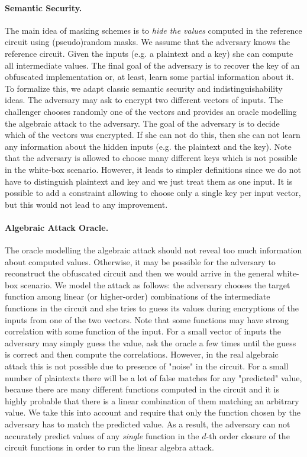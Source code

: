 \paragraph{Semantic Security.}
The main idea of masking schemes is to \emph{hide the values} computed in the reference circuit using (pseudo)random masks. We assume that the adversary knows the reference circuit. Given the inputs (e.g. a plaintext and a key) she can compute all intermediate values. The final goal of the adversary is to recover the key of an obfuscated implementation or, at least, learn some partial information about it. To formalize this, we adapt classic semantic security and indistinguishability ideas. The adversary may ask to encrypt two different vectors of inputs. The challenger chooses randomly one of the vectors and provides an oracle modelling the algebraic attack to the adversary. The goal of the adversary is to decide which of the vectors was encrypted. If she can not do this, then she can not learn any information about the hidden inputs (e.g. the plaintext and the key). Note that the adversary is allowed to choose many different keys which is not possible in the white-box scenario. However, it leads to simpler definitions since we do not have to distinguish plaintext and key and we just treat them as one input. It is possible to add a constraint allowing to choose only a single key per input vector, but this would not lead to any improvement.

\paragraph{Algebraic Attack Oracle.}
The oracle modelling the algebraic attack should not reveal too much information about computed values. Otherwise, it may be possible for the adversary to reconstruct the obfuscated circuit and then we would arrive in the general white-box scenario. We model the attack as follows: the adversary chooses the target function among linear (or higher-order) combinations of the intermediate functions in the circuit and she tries to guess its values during encryptions of the inputs from one of the two vectors. Note that some functions may have strong correlation with some function of the input. For a small vector of inputs the adversary may simply guess the value, ask the oracle a few times until the guess is correct and then compute the correlations. However, in the real algebraic attack this is not possible due to presence of "noise" in the circuit. For a small number of plaintexts there will be a lot of false matches for any "predicted" value, because there are many different functions computed in the circuit and it is highly probable that there is a linear combination of them matching an arbitrary value. We take this into account and require that only the function chosen by the adversary has to match the predicted value. As a result, the adversary can not accurately predict values of any \emph{single} function in the $d$-th order closure of the circuit functions in order to run the linear algebra attack. 

